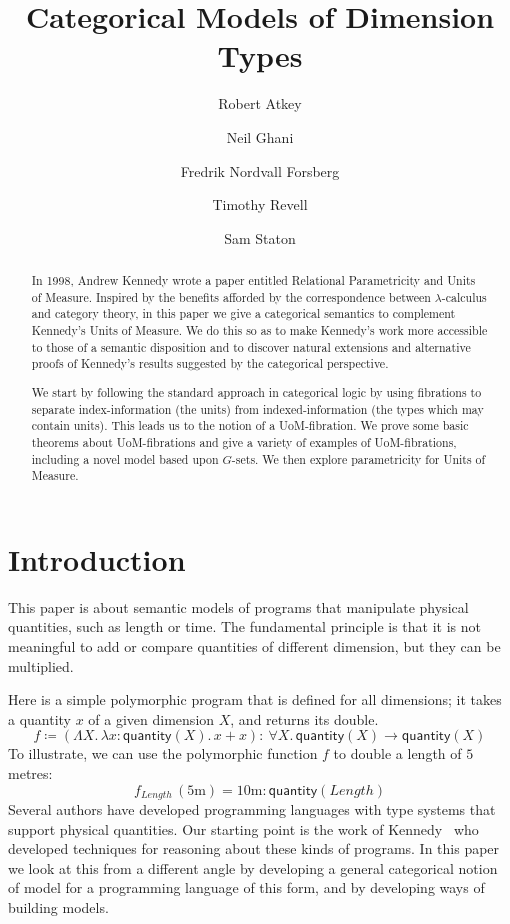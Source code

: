 \documentclass[a4paper,UKenglish]{lipics}
\title{Categorical Models of Dimension Types}
\author[1]{Robert Atkey}
\author[2]{Neil Ghani}
\author[2]{Fredrik Nordvall Forsberg}
\author[2]{Timothy Revell}
\author[3]{Sam Staton}
\affil[1]{University of Edinburgh}
\affil[2]{University of Strathclyde}
\affil[3]{University of Cambridge}
\newcommand{\UoM}{Units of Measure\xspace}
\newcommand{\msf}[1]{\mathsf{#1}} %
\newcommand{\qnt}{\msf{quantity}}
\newcommand{\length}{\mathit{Length}}
\newcommand{\UoMFibrations}{UoM-fibrations\xspace}
\begin{document}
\maketitle

\begin{abstract}

  In 1998, Andrew Kennedy wrote a paper entitled Relational Parametricity and \UoM\cite{Kennedy:1997:RPU:263699.263761}. Inspired by the benefits afforded by the correspondence between $\lambda$-calculus and category theory, in this paper we give a categorical semantics to complement Kennedy's \UoM. We do this so as to make Kennedy's work more accessible to those of a semantic disposition and to discover natural extensions and alternative proofs of Kennedy's results suggested by the categorical perspective.

  We start by following the standard approach in categorical logic by using fibrations to separate index-information (the units) from indexed-information (the types which may contain units). This leads us to the notion of a UoM-fibration. We prove some basic theorems about UoM-fibrations and give a variety of examples of \UoMFibrations, including a novel model based upon $G$-sets. We then explore parametricity for \UoM.
\end{abstract}

\section{Introduction}
This paper is about semantic models of programs
that manipulate physical quantities, such
as length or time. The fundamental principle is that it is not
meaningful to add or compare quantities of different dimension, but
they can be multiplied.

Here is a simple polymorphic program that is defined for all dimensions;
it takes a quantity $x$ of a given dimension $X$, and returns its double.
\begin{equation}
f\coloneqq (\Lambda X.\,\lambda x:\qnt(X).\,x+x)
:\ \forall X.\,\qnt(X)\to \qnt(X)
\label{eqn:double}
\end{equation}
To illustrate, we can use the polymorphic
function $f$ to double a length of $5$ metres:
\begin{equation}
f_\length\,(5\mathrm{m})=
10\mathrm{m}:\qnt(\length)
\label{eqn:doubleapp}
\end{equation}
Several authors have developed programming languages with type systems
that support physical quantities. Our starting point is the work of
Kennedy~\cite{Kennedy:1997:RPU:263699.263761} who developed techniques
for reasoning about these kinds of programs. In this paper we look at
this from a different angle by developing a general categorical notion
of model for a programming language of this form, and by developing
ways of building models.
\end{document}
